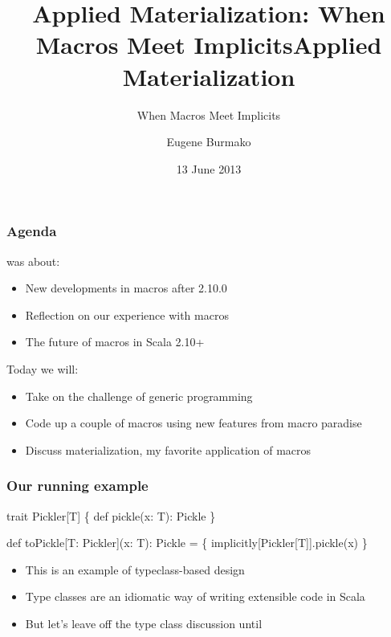 \documentclass[svgnames,hyperref={bookmarks=false}]{beamer}
\title{Applied Materialization: When Macros Meet Implicits}
\begin{document}
\title{Applied Materialization}
\subtitle{When Macros Meet Implicits}
\author{Eugene Burmako}
\date{13 June 2013}
{
\begin{frame}
  \titlepage
\end{frame}
}

\begin{frame}[fragile]
\frametitle{Agenda}

 was about:
\begin{itemize}
\item New developments in macros after 2.10.0
\item Reflection on our experience with macros
\item The future of macros in Scala 2.10+
\end{itemize}

\vskip20pt
Today we will:
\begin{itemize}
\item Take on the challenge of generic programming
\item Code up a couple of macros using new features from macro paradise
\item Discuss materialization, my favorite application of macros
\end{itemize}
\end{frame}

\begin{frame}[fragile]
\frametitle{}

\vskip40pt
\begin{center}
\end{center}
\end{frame}

\begin{frame}[fragile]
\frametitle{Our running example}

\begin{semiverbatim}
trait Pickler[T] \{
  def pickle(x: T): Pickle
\}

def toPickle[T: Pickler](x: T): Pickle = \{
  implicitly[Pickler[T]].pickle(x)
\}

\end{semiverbatim}

\begin{itemize}
\item This is an example of typeclass-based design
\item Type classes are an idiomatic way of writing extensible code in Scala
\item But let's leave off the type class discussion until 
\end{itemize}
\end{frame}
\end{document}

